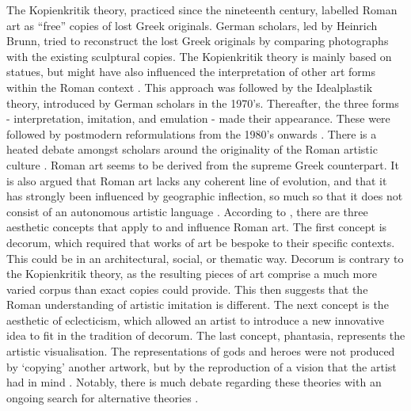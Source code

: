 	The Kopienkritik theory, practiced since the nineteenth century, labelled Roman art as “free” copies of lost Greek originals. 
German scholars, led by Heinrich Brunn, tried to reconstruct the lost Greek originals by comparing photographs with the existing sculptural copies. 
The Kopienkritik theory is mainly based on statues, but might have also influenced the interpretation of other art forms within the Roman context \parencites{Perry_2005}[4--6]{Gazda_2002}. 
This approach was followed by the Idealplastik theory, 
introduced by German scholars in the 1970’s. Thereafter, the three forms - interpretation, imitation, and emulation - made their appearance. These were followed by postmodern reformulations from the 1980’s onwards \parencite[7--9]{Gazda_2002} . 
	There is a heated debate amongst scholars around the originality of the Roman artistic culture \parencite {LaRocca_2010}. 
Roman art seems to be derived from the supreme Greek counterpart. 
It is also argued that Roman art lacks any coherent line of evolution, and that it has strongly been influenced by geographic inflection, so much so that it does not consist of an autonomous artistic language \parencite [344--345] {LaRocca_2010}. 
	According to \textcite{Perry_2005}, there are three aesthetic concepts that 
apply to and influence Roman art. The first concept is decorum, which required that works of art be bespoke to their specific contexts. This could be in an architectural, social, or thematic way. 
Decorum is contrary to the Kopienkritik theory, as the resulting pieces of art comprise a much more varied corpus than exact copies could provide.
This then suggests that the Roman understanding of artistic imitation is different. 
The next concept is the aesthetic of eclecticism, which allowed an artist to introduce a new innovative idea to fit in the tradition of decorum. The last concept, phantasia, represents the artistic visualisation. 
The representations of gods and heroes were not produced by ‘copying’ another artwork, but by the reproduction of a vision that the artist had in mind \parencite {Perry_2005}. 
Notably, there is much debate regarding these theories with an ongoing search for alternative theories \parencite [16]{Gazda_2002}. 
	
